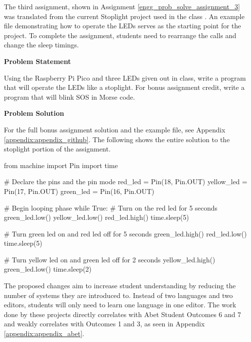 The third assignment, shown in Assignment \ref{engg_prob_solve_assignment_3} was translated from the 
current Stoplight project used in the class \cite{stoplight}. An example file
demonstrating how to operate the LEDs serves as the starting point for the project. To complete the
assignment, students need to rearrange the  calls and change the sleep timings.

\label{engg_prob_solve_assignment_3}

\begin{tcolorbox}[breakable, enhanced jigsaw, title=DEN 161: Assignment \ref{engg_prob_solve_assignment_3}, 
    colframe=ksu-purple, colback=ksu-gray]

    \textbf{Problem Statement}
    \parindent15pt

    Using the Raspberry Pi Pico and three LEDs given out in class, write a program that will operate
    the LEDs like a stoplight. For bonus assignment credit, write a program that will blink SOS in Morse code.
    
    \tcblower
    \textbf{Problem Solution}
    \parindent15pt
    
    For the full bonus assignment solution and the example file, see Appendix \ref{appendix:appendix_github}. 
    The following shows the entire solution to the stoplight portion of the assignment.

\begin{python}
from machine import Pin
import time

# Declare the pins and the pin mode
red_led = Pin(18, Pin.OUT)
yellow_led = Pin(17, Pin.OUT)
green_led = Pin(16, Pin.OUT)

# Begin looping phase
while True:
    # Turn on the red led for 5 seconds
    green_led.low()
    yellow_led.low()
    red_led.high()
    time.sleep(5)

    # Turn green led on and red led off for 5 seconds
    green_led.high()
    red_led.low()
    time.sleep(5)

    # Turn yellow led on and green led off for 2 seconds
    yellow_led.high()
    green_led.low()
    time.sleep(2)
    \end{python}
\end{tcolorbox}


The proposed changes aim to increase student understanding by reducing the number of systems they are introduced 
to. Instead of two languages and two editors, students will only need to learn one language in one editor. The 
work done by these projects directly correlates with Abet Student Outcomes 6 and 7 and weakly correlates with 
Outcomes 1 and 3, as seen in Appendix \ref{appendix:appendix_abet}.

